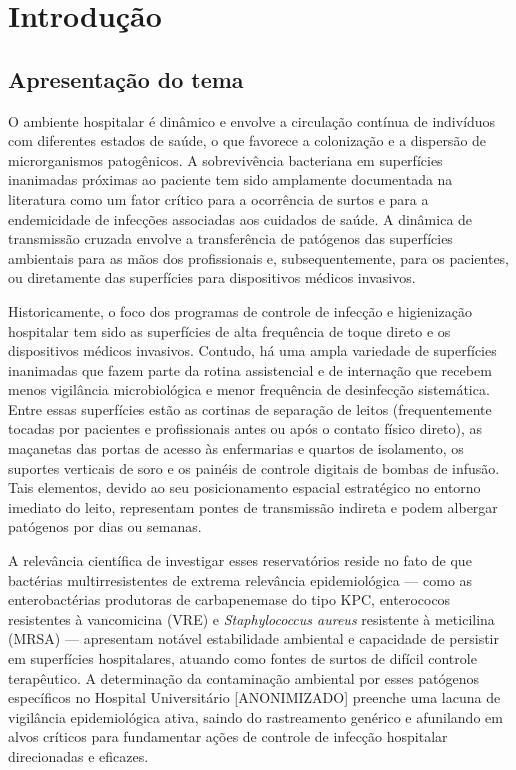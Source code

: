 \documentclass[12pt,a4paper]{article}
\begin{document}
\section{Introdução}

\subsection{Apresentação do tema}
O ambiente hospitalar é dinâmico e envolve a circulação contínua de indivíduos com diferentes estados de saúde, o que favorece a colonização e a dispersão de microrganismos patogênicos. A sobrevivência bacteriana em superfícies inanimadas próximas ao paciente tem sido amplamente documentada na literatura como um fator crítico para a ocorrência de surtos e para a endemicidade de infecções associadas aos cuidados de saúde. A dinâmica de transmissão cruzada envolve a transferência de patógenos das superfícies ambientais para as mãos dos profissionais e, subsequentemente, para os pacientes, ou diretamente das superfícies para dispositivos médicos invasivos.

Historicamente, o foco dos programas de controle de infecção e higienização hospitalar tem sido as superfícies de alta frequência de toque direto e os dispositivos médicos invasivos. Contudo, há uma ampla variedade de superfícies inanimadas que fazem parte da rotina assistencial e de internação que recebem menos vigilância microbiológica e menor frequência de desinfecção sistemática. Entre essas superfícies estão as cortinas de separação de leitos (frequentemente tocadas por pacientes e profissionais antes ou após o contato físico direto), as maçanetas das portas de acesso às enfermarias e quartos de isolamento, os suportes verticais de soro e os painéis de controle digitais de bombas de infusão. Tais elementos, devido ao seu posicionamento espacial estratégico no entorno imediato do leito, representam pontes de transmissão indireta e podem albergar patógenos por dias ou semanas.

A relevância científica de investigar esses reservatórios reside no fato de que bactérias multirresistentes de extrema relevância epidemiológica --- como as enterobactérias produtoras de carbapenemase do tipo KPC, enterococos resistentes à vancomicina (VRE) e \textit{Staphylococcus aureus} resistente à meticilina (MRSA) --- apresentam notável estabilidade ambiental e capacidade de persistir em superfícies hospitalares, atuando como fontes de surtos de difícil controle terapêutico. A determinação da contaminação ambiental por esses patógenos específicos no Hospital Universitário [ANONIMIZADO] preenche uma lacuna de vigilância epidemiológica ativa, saindo do rastreamento genérico e afunilando em alvos críticos para fundamentar ações de controle de infecção hospitalar direcionadas e eficazes.
\end{document}
